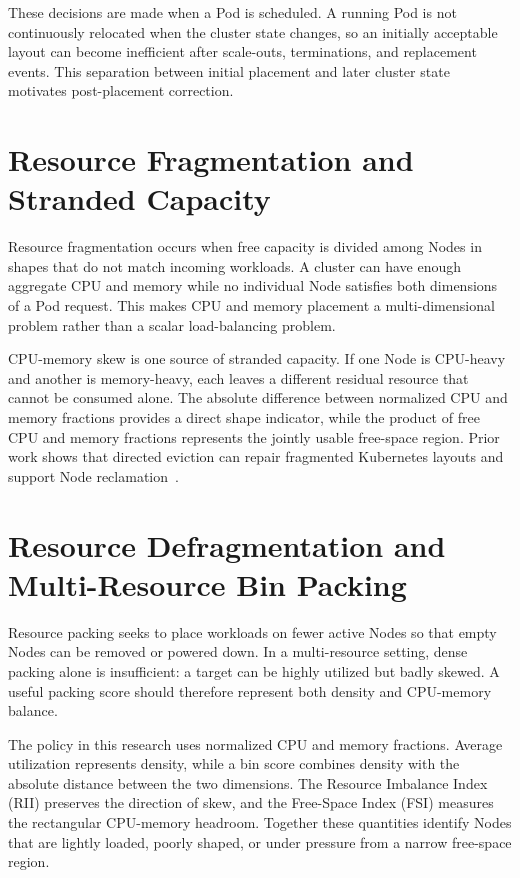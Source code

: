 These decisions are made when a Pod is scheduled. A running Pod is not continuously relocated when the cluster state changes, so an initially acceptable layout can become inefficient after scale-outs, terminations, and replacement events. This separation between initial placement and later cluster state motivates post-placement correction.

\section{Resource Fragmentation and Stranded Capacity}
\label{sec:resourceFragmentation}

Resource fragmentation occurs when free capacity is divided among Nodes in shapes that do not match incoming workloads. A cluster can have enough aggregate CPU and memory while no individual Node satisfies both dimensions of a Pod request. This makes CPU and memory placement a multi-dimensional problem rather than a scalar load-balancing problem.

CPU-memory skew is one source of stranded capacity. If one Node is CPU-heavy and another is memory-heavy, each leaves a different residual resource that cannot be consumed alone. The absolute difference between normalized CPU and memory fractions provides a direct shape indicator, while the product of free CPU and memory fractions represents the jointly usable free-space region. Prior work shows that directed eviction can repair fragmented Kubernetes layouts and support Node reclamation~\citep{larsson_klein_elmroth_2023}.

\section{Resource Defragmentation and Multi-Resource Bin Packing}
\label{sec:binPacking}

Resource packing seeks to place workloads on fewer active Nodes so that empty Nodes can be removed or powered down. In a multi-resource setting, dense packing alone is insufficient: a target can be highly utilized but badly skewed. A useful packing score should therefore represent both density and CPU-memory balance.

The policy in this research uses normalized CPU and memory fractions. Average utilization represents density, while a bin score combines density with the absolute distance between the two dimensions. The Resource Imbalance Index (RII) preserves the direction of skew, and the Free-Space Index (FSI) measures the rectangular CPU-memory headroom. Together these quantities identify Nodes that are lightly loaded, poorly shaped, or under pressure from a narrow free-space region.

